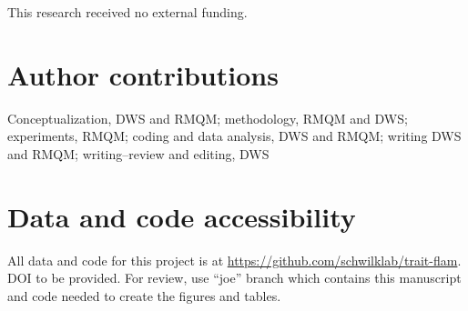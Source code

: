 \documentclass[letterpaper,12pt]{article}
\begin{document}
This research received no external funding.

\section*{Author contributions}

Conceptualization, DWS and RMQM; methodology, RMQM and DWS; experiments, RMQM;
coding and data analysis, DWS and RMQM; writing DWS and RMQM; writing--review
and editing, DWS

\section*{Data and code accessibility}
All data and code for this project is at
\url{https://github.com/schwilklab/trait-flam}. DOI to be provided. For review,
use ``joe'' branch which contains this manuscript and code needed to create the
figures and tables.

\newpage




\end{document}
